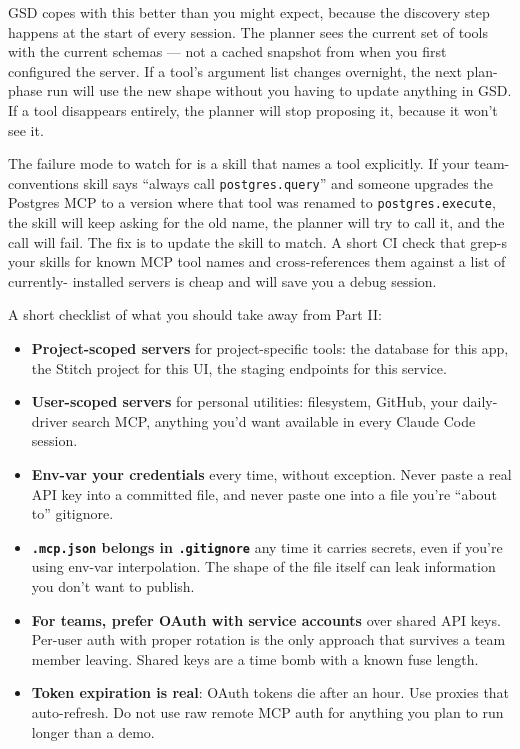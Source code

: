 \documentclass[11pt,letterpaper,openany]{book}
\begin{document}
GSD copes with this better than you might expect, because the
discovery step happens at the start of every session. The planner
sees the current set of tools with the current schemas --- not a
cached snapshot from when you first configured the server. If a
tool's argument list changes overnight, the next plan-phase run
will use the new shape without you having to update anything in
GSD. If a tool disappears entirely, the planner will stop proposing
it, because it won't see it.

The failure mode to watch for is a skill that names a tool
explicitly. If your team-conventions skill says ``always call
\texttt{postgres.query}'' and someone upgrades the Postgres MCP to
a version where that tool was renamed to \texttt{postgres.execute},
the skill will keep asking for the old name, the planner will try
to call it, and the call will fail. The fix is to update the skill
to match. A short CI check that grep-s your skills for known MCP
tool names and cross-references them against a list of currently-
installed servers is cheap and will save you a debug session.

\begin{gsdnote}
A short checklist of what you should take away from Part II:
\begin{itemize}
  \item \textbf{Project-scoped servers} for project-specific tools: the
        database for this app, the Stitch project for this UI, the
        staging endpoints for this service.
  \item \textbf{User-scoped servers} for personal utilities: filesystem,
        GitHub, your daily-driver search MCP, anything you'd want
        available in every Claude Code session.
  \item \textbf{Env-var your credentials} every time, without exception.
        Never paste a real API key into a committed file, and never
        paste one into a file you're ``about to'' gitignore.
  \item \textbf{\texttt{.mcp.json} belongs in \texttt{.gitignore}} any
        time it carries secrets, even if you're using env-var
        interpolation. The shape of the file itself can leak
        information you don't want to publish.
  \item \textbf{For teams, prefer OAuth with service accounts} over
        shared API keys. Per-user auth with proper rotation is the
        only approach that survives a team member leaving. Shared
        keys are a time bomb with a known fuse length.
  \item \textbf{Token expiration is real}: OAuth tokens die after an
        hour. Use proxies that auto-refresh. Do not use raw remote
        MCP auth for anything you plan to run longer than a
        demo.
\end{itemize}
\end{gsdnote}
\end{document}

